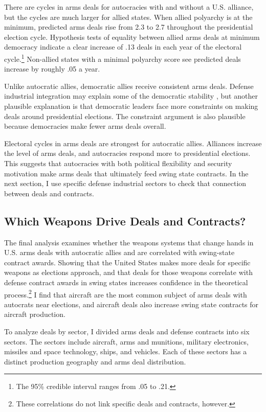 \documentclass[12pt]{article}
\begin{document}
There are cycles in arms deals for autocracies with and without a U.S. alliance, but the cycles are much larger for allied states. 
When allied polyarchy is at the minimum, predicted arms deals rise from 2.3 to 2.7 throughout the presidential election cycle.
Hypothesis tests of equality between allied arms deals at minimum democracy indicate a clear increase of .13 deals in each year of the electoral cycle.\footnote{The 95\% credible interval ranges from .05 to .21.}
Non-allied states with a minimal polyarchy score see predicted deals increase by roughly .05 a year.


Unlike autocratic allies, democratic allies receive consistent arms deals. 
Defense industrial integration may explain some of the democratic stability \citep{Brooks2005}, but another plausible explanation is that democratic leaders face more constraints on making deals around presidential elections.
The constraint argument is also plausible because democracies make fewer arms deals overall. 


Electoral cycles in arms deals are strongest for autocratic allies. 
Alliances increase the level of arms deals, and autocracies respond more to presidential elections. 
This suggests that autocracies with both political flexibility and security motivation make arms deals that ultimately feed swing state contracts. 
In the next section, I use specific defense industrial sectors to check that connection between deals and contracts. 



\subsection{Which Weapons Drive Deals and Contracts?} 


The final analysis examines whether the weapons systems that change hands in U.S. arms deals with autocratic allies and are correlated with swing-state contract awards. 
Showing that the United States makes more deals for specific weapons as elections approach, and that deals for those weapons correlate with defense contract awards in swing states increases confidence in the theoretical process.\footnote{These correlations do not link specific deals and contracts, however.}
I find that aircraft are the most common subject of arms deals with autocrats near elections, and aircraft deals also increase swing state contracts for aircraft production.


To analyze deals by sector, I divided arms deals and defense contracts into six sectors. 
The sectors include aircraft, arms and munitions, military electronics, missiles and space technology, ships, and vehicles.  
Each of these sectors has a distinct production geography and arms deal distribution.
\end{document}

